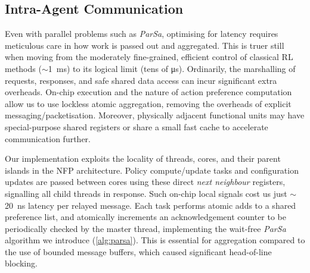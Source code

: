 \documentclass[
sigconf,natbib=false
]{acmart}
\begin{document}
\subsection{Intra-Agent Communication}\label{sec:intra-agent-communication}
Even with parallel problems such as \emph{ParSa}, optimising for latency requires meticulous care in how work is passed out and aggregated.
This is truer still when moving from the moderately fine-grained, efficient control of classical RL methods ($\sim$\SI{1}{\milli\second}) to its logical limit (tens of \si{\micro\second}).
Ordinarily, the marshalling of requests, responses, and safe shared data access can incur significant extra overheads.
On-chip execution and the nature of action preference computation allow us to use lockless atomic aggregation, removing the overheads of explicit messaging/packetisation.
Moreover, physically adjacent functional units may have special-purpose shared registers or share a small fast cache to accelerate communication further.


Our implementation exploits the locality of threads, cores, and their parent islands in the NFP architecture.
Policy compute/update tasks and configuration updates are passed between cores using these direct \emph{next neighbour} registers, signalling all child threads in response.
Such on-chip local signals cost us just $\sim$\SI{20}{\nano\second} latency per relayed message.
Each task performs atomic adds to a shared preference list, and atomically increments an acknowledgement counter to be periodically checked by the master thread, implementing the wait-free \emph{ParSa} algorithm we introduce (\cref{alg:parsa}).
This is essential for aggregation compared to the use of bounded message buffers, which caused significant head-of-line blocking.

%
\end{document}
